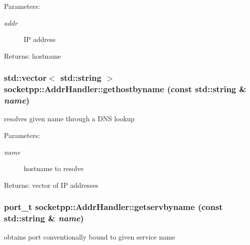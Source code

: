 \begin{Desc}
\item[Parameters:]
\begin{description}
\item[{\em addr}]IP address \end{description}
\end{Desc}
\begin{Desc}
\item[Returns:]hostname \end{Desc}
\hypertarget{classsocketpp_1_1AddrHandler_d840f7fee97d701511f09459bef35748}{
\subsubsection[{gethostbyname}]{\setlength{\rightskip}{0pt plus 5cm}std::vector$<$ std::string $>$ socketpp::AddrHandler::gethostbyname (const std::string \& {\em name})}}
\label{classsocketpp_1_1AddrHandler_d840f7fee97d701511f09459bef35748}


resolves given name through a DNS lookup 

\begin{Desc}
\item[Parameters:]
\begin{description}
\item[{\em name}]hostname to resolve \end{description}
\end{Desc}
\begin{Desc}
\item[Returns:]vector of IP addresses \end{Desc}
\hypertarget{classsocketpp_1_1AddrHandler_aa24239225e2a35cce9322dfa68bf438}{
\subsubsection[{getservbyname}]{\setlength{\rightskip}{0pt plus 5cm}port\_\-t socketpp::AddrHandler::getservbyname (const std::string \& {\em name})}}
\label{classsocketpp_1_1AddrHandler_aa24239225e2a35cce9322dfa68bf438}


obtains port conventionally bound to given service name 

